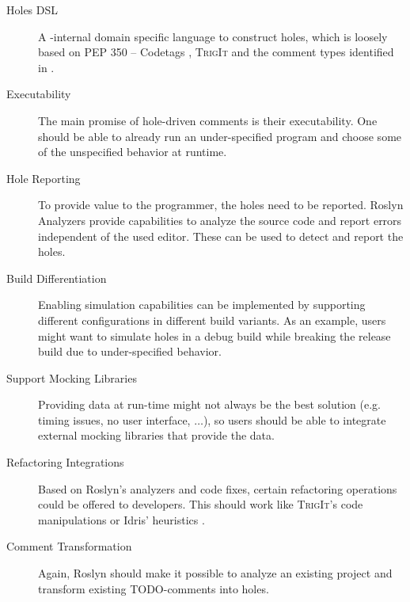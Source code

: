 
\begin{description}
   \item[Holes DSL] A \CS-internal domain specific language to construct holes, which is loosely based on PEP 350 -- Codetags \cite{elliott_pep_2005}, \textsc{TrigIt} \cite{nie_framework_2019} and the comment types identified in \cite{ying_source_2005}.
   \item[Executability] The main promise of hole-driven comments is their executability. One should be able to already run an under-specified program and choose some of the unspecified behavior at runtime.
   \item[Hole Reporting] To provide value to the programmer, the holes need to be reported. Roslyn Analyzers provide capabilities to analyze the source code and report errors independent of the used editor. These can be used to detect and report the holes.
   \item[Build Differentiation] Enabling simulation capabilities can be implemented by supporting different configurations in different build variants. As an example, users might want to simulate holes in a debug build while breaking the release build due to under-specified behavior.
   \item[Support Mocking Libraries] Providing data at run-time might not always be the best solution (e.g. timing issues, no user interface, $\dotsc$), so users should be able to integrate external mocking libraries that provide the data.
   \item[Refactoring Integrations] Based on Roslyn's analyzers and code fixes, certain refactoring operations could be offered to developers. This should work like \textsc{TrigIt}'s code manipulations \cite{nie_framework_2019} or Idris' heuristics \cite{brady_type-driven_2017}.
   \item[Comment Transformation] Again, Roslyn should make it possible to analyze an existing project and transform existing TODO-comments into holes.
\end{description}